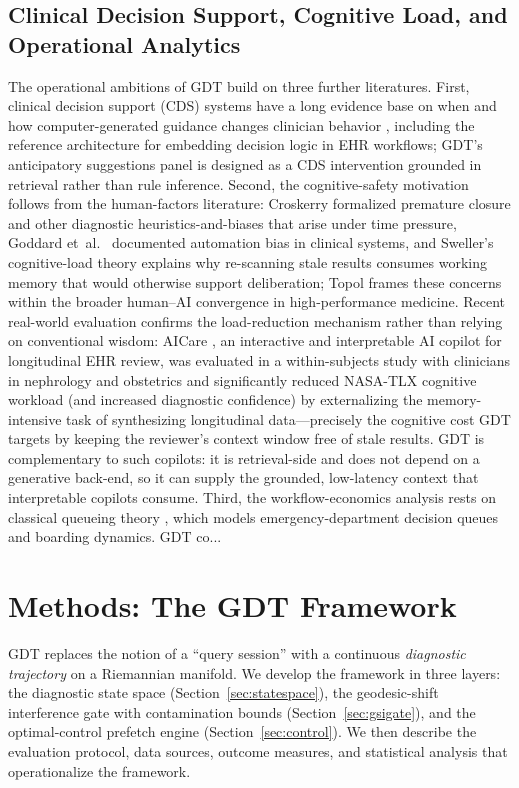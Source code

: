 \documentclass[11pt]{article}
\begin{document}
\subsection{Clinical Decision Support, Cognitive Load, and Operational Analytics}
The operational ambitions of GDT build on three further literatures. First, clinical decision support (CDS) systems have a long evidence base on when and how computer-generated guidance changes clinician behavior \citep{musen2014_cds,sutton2020_cds}, including the reference architecture for embedding decision logic in EHR workflows; GDT's anticipatory suggestions panel is designed as a CDS intervention grounded in retrieval rather than rule inference. Second, the cognitive-safety motivation follows from the human-factors literature: Croskerry \citep{croskerry2003} formalized premature closure and other diagnostic heuristics-and-biases that arise under time pressure, Goddard et~al.\ \citep{goddard2012} documented automation bias in clinical systems, and Sweller's cognitive-load theory \citep{sweller1988_cogl} explains why re-scanning stale results consumes working memory that would otherwise support deliberation; Topol \citep{topol2019} frames these concerns within the broader human--AI convergence in high-performance medicine. Recent real-world evaluation confirms the load-reduction mechanism rather than relying on conventional wisdom: AICare \citep{zhu2026_aicare}, an interactive and interpretable AI copilot for longitudinal EHR review, was evaluated in a within-subjects study with clinicians in nephrology and obstetrics and significantly reduced NASA-TLX cognitive workload (and increased diagnostic confidence) by externalizing the memory-intensive task of synthesizing longitudinal data---precisely the cognitive cost GDT targets by keeping the reviewer's context window free of stale results. GDT is complementary to such copilots: it is retrieval-side and does not depend on a generative back-end, so it can supply the grounded, low-latency context that interpretable copilots consume. Third, the workflow-economics analysis rests on classical queueing theory \citep{kleinrock1975,gross2008}, which models emergency-department decision queues and boarding dynamics. GDT co...

\section{Methods: The GDT Framework}
\label{sec:methods}

GDT replaces the notion of a ``query session'' with a continuous \emph{diagnostic trajectory} on a Riemannian manifold. We develop the framework in three layers: the diagnostic state space (Section~\ref{sec:statespace}), the geodesic-shift interference gate with contamination bounds (Section~\ref{sec:gsigate}), and the optimal-control prefetch engine (Section~\ref{sec:control}). We then describe the evaluation protocol, data sources, outcome measures, and statistical analysis that operationalize the framework.
\end{document}
